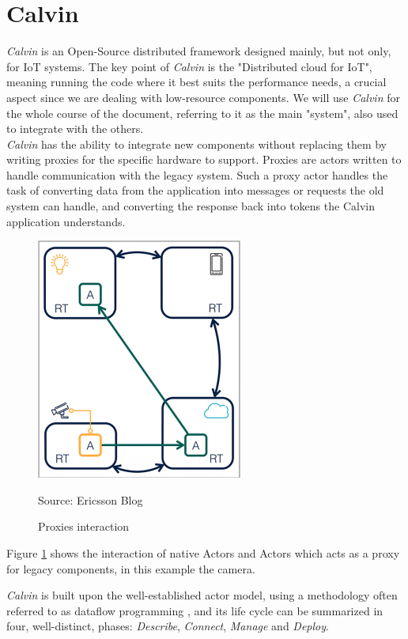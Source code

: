 \section{Calvin}
\label{calvin}
  \textit{Calvin} is an Open-Source distributed framework designed mainly, but not only,
  for IoT systems. The key point of \textit{Calvin} is the "Distributed cloud for IoT", meaning
  running the code where it best suits the performance needs, a crucial aspect since we are
  dealing with low-resource components. We will use \textit{Calvin} for the whole course of the document,
  referring to it as the main "system", also used to integrate with the others. \\
  \textit{Calvin} has the ability to integrate new components without replacing them by writing
  proxies for the specific hardware to support. Proxies are actors written to handle
  communication with the legacy system. Such a proxy actor handles the task of converting data
  from the application into messages or requests the old system can handle, and converting the
  response back into tokens the Calvin application understands.\cite{calvin2}

        \begin{figure}[h]
        \caption{Proxies interaction}

        \label{fig:calvinproxy}
        \centering
        \includegraphics[scale=0.75]{calvin4.png}
        \par{Source: Ericsson Blog \cite{calvin2}}
        \end{figure}
  Figure \ref{fig:calvinproxy} shows the interaction of native Actors and Actors which
  acts as a proxy for legacy components, in this example the camera.




  \textit{Calvin} is built upon the well-established actor model, using a methodology often referred to as dataflow programming \cite{calvin1}, and
  its life cycle can be summarized in four, well-distinct, phases: \textit{Describe}, \textit{Connect}, \textit{Manage}
  and \textit{Deploy}\cite{calvin-article}.

